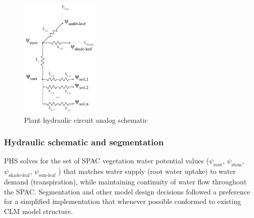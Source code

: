\documentclass[draft,linenumbers]{agujournal}
\begin{document}
  \begin{figure}[h]
     \centering
     \includegraphics[width=9pc]{../figs/circuit.pdf}
     \caption{Plant hydraulic circuit analog schematic}
     \label{circuit}
  \end{figure}

  \subsubsection{Hydraulic schematic and segmentation}
  PHS solves for the set of SPAC vegetation water potential values ($\psi_{\text{root}}$, $\psi_{\text{stem}}$, $\psi_{\text{shade-leaf}}$, $\psi_{\text{sun-leaf}}$ ) that matches water supply (root water uptake) to water demand (transpiration), while maintaining continuity of water flow throughout the SPAC. Segmentation and other model design decisions followed a preference for a simplified implementation that whenever possible conformed to existing CLM model structure.
  
\end{document}
